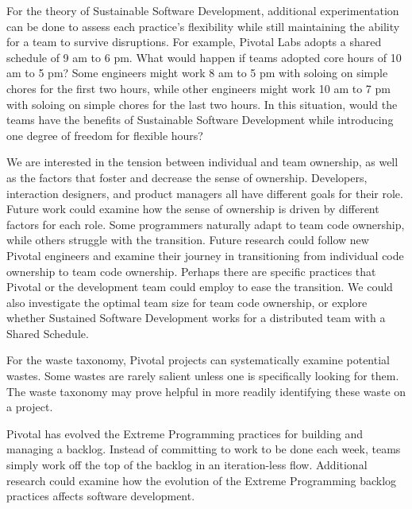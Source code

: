 For the theory of Sustainable Software Development, additional experimentation can be done to assess each practice’s flexibility
while still maintaining the ability for a team to survive disruptions. For example, Pivotal Labs adopts a shared schedule of 9 am to 6 pm. What would happen if teams adopted core hours of 10 am to 5 pm? Some engineers might work 8 am to 5 pm with soloing on simple chores for the first two hours, while other engineers might work 10 am to 7 pm with soloing on simple chores for the last two hours. In this situation, would the teams have the benefits of Sustainable Software Development while introducing one degree of freedom for flexible hours?


We are interested in the tension between individual and team ownership, as well as the factors that foster and decrease the sense of ownership. Developers, interaction designers, and product managers all have different goals for their role. Future work could examine how the sense of ownership is driven by different factors for each role. Some programmers naturally adapt to team code ownership, while others struggle with the transition. Future research could follow new Pivotal engineers and examine their journey in transitioning from individual code ownership to team code ownership. Perhaps there are specific practices that Pivotal or the development team could employ to ease the transition. We could also investigate the optimal team size for team code ownership, or explore whether Sustained Software Development works for a distributed team with a Shared Schedule.


For the waste taxonomy, Pivotal projects can systematically examine potential wastes. Some wastes are rarely salient unless one is specifically looking for them. The waste taxonomy may prove helpful in more readily identifying these waste on a project. 


Pivotal has evolved the Extreme Programming practices for building and managing a backlog. Instead of committing to work to be done each week, teams simply work off the top of the backlog in an iteration-less flow. Additional research could examine how the evolution of the Extreme Programming backlog practices affects software development.
